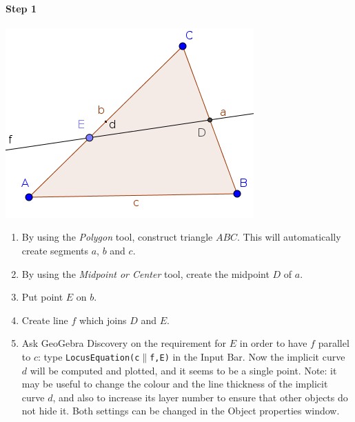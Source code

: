 \documentclass{article}
\begin{document}
\paragraph{Step 1}
\begin{center}
\includegraphics[scale=0.5]{classroom1}
\end{center}
\begin{enumerate}
    \item By using the \textit{Polygon} tool, construct triangle $ABC$. This will automatically create segments $a$, $b$ and $c$.
    \item By using the \textit{Midpoint or Center} tool, create the midpoint $D$ of $a$.
    \item Put point $E$ on $b$.
    \item Create line $f$ which joins $D$ and $E$.
    \item Ask GeoGebra Discovery on the requirement for $E$ in order to have $f$ parallel to $c$: type \texttt{LocusEquation(c$\parallel$f,E)} in the Input Bar. Now the implicit curve $d$ will be computed and plotted, and it seems to be a single point. Note: it may be useful to change the colour and the line thickness of the implicit curve $d$, and also to increase its layer number to ensure that other objects do not hide it. Both settings can be changed in the Object properties window.
\end{enumerate}
\end{document}
